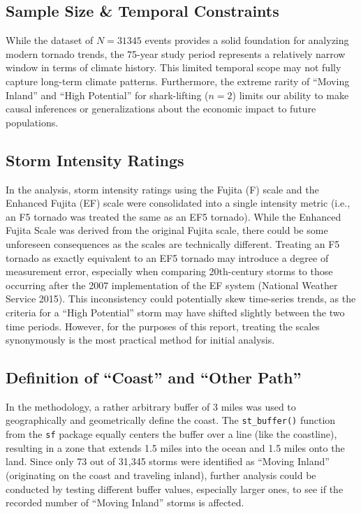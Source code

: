 \documentclass[
  letterpaper,
  DIV=11,
  numbers=noendperiod]{scrreprt}
\begin{document}
\subsection{Sample Size \& Temporal
Constraints}\label{sample-size-temporal-constraints}

While the dataset of \(N=31345\) events provides a solid foundation for
analyzing modern tornado trends, the 75-year study period represents a
relatively narrow window in terms of climate history. This limited
temporal scope may not fully capture long-term climate patterns.
Furthermore, the extreme rarity of ``Moving Inland'' and ``High
Potential'' for shark-lifting (\(n=2\)) limits our ability to make
causal inferences or generalizations about the economic impact to future
populations.

\subsection{Storm Intensity Ratings}\label{storm-intensity-ratings}

In the analysis, storm intensity ratings using the Fujita (F) scale and
the Enhanced Fujita (EF) scale were consolidated into a single intensity
metric (i.e., an F5 tornado was treated the same as an EF5 tornado).
While the Enhanced Fujita Scale was derived from the original Fujita
scale, there could be some unforeseen consequences as the scales are
technically different. Treating an F5 tornado as exactly equivalent to
an EF5 tornado may introduce a degree of measurement error, especially
when comparing 20th-century storms to those occurring after the 2007
implementation of the EF system (National Weather Service 2015). This
inconsistency could potentially skew time-series trends, as the criteria
for a ``High Potential'' storm may have shifted slightly between the two
time periods. However, for the purposes of this report, treating the
scales synonymously is the most practical method for initial analysis.

\subsection{Definition of ``Coast'' and ``Other
Path''}\label{definition-of-coast-and-other-path}

In the methodology, a rather arbitrary buffer of 3 miles was used to
geographically and geometrically define the coast. The
\texttt{st\_buffer()} function from the \texttt{sf} package equally
centers the buffer over a line (like the coastline), resulting in a zone
that extends 1.5 miles into the ocean and 1.5 miles onto the land. Since
only 73 out of 31,345 storms were identified as ``Moving Inland''
(originating on the coast and traveling inland), further analysis could
be conducted by testing different buffer values, especially larger ones,
to see if the recorded number of ``Moving Inland'' storms is affected.
\end{document}
